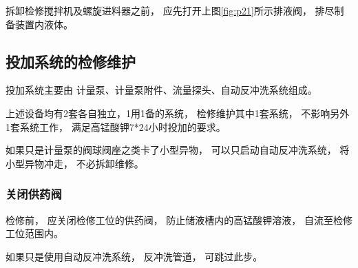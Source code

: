 \documentclass[UTF8,a4paper,12pt,titlepage]{ctexart}
\begin{document}
            \par 拆卸检修搅拌机及螺旋进料器之前，
            应先打开上图\ref{fig:p21}所示排液阀，
            排尽制备装置内液体。

   \subsection{投加系统的检修维护}
        投加系统主要由
        计量泵、计量泵附件、流量探头、自动反冲洗系统组成。
        \par 上述设备均有2套各自独立，1用1备的系统，
        检修维护其中1套系统，
        不影响另外1套系统工作，
        满足高锰酸钾7*24小时投加的要求。
        \par 如果只是计量泵的阀球阀座之类卡了小型异物，
        可以只启动自动反冲洗系统，
        将小型异物冲走，
        不必拆卸维修。

        \subsubsection{关闭供药阀}
            检修前，
            应关闭检修工位的供药阀，
            防止储液槽内的高锰酸钾溶液，
            自流至检修工位范围内。
            \par 如果只是使用自动反冲洗系统，
            反冲洗管道，
            可跳过此步。

            \newpage
            
\end{document}
